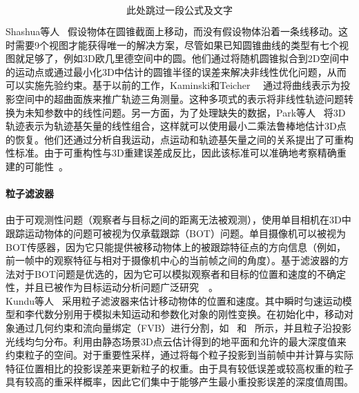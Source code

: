 $$此处跳过一段公式及文字$$

Shashua等人~\cite{shashua1999trajectory}
假设物体在圆锥截面上移动，而没有假设物体沿着一条线移动。这时需要9个视图才能获得唯一的解决方案，尽管如果已知圆锥曲线的类型有七个视图就足够了，例如3D欧几里德空间中的圆。他们通过将随机圆锥拟合到2D空间中的运动点或通过最小化3D中估计的圆锥半径的误差来解决非线性优化问题，从而可以实施先验约束。基于以前的工作，Kaminski和Teicher~\cite{kaminski2002general}~\cite{kaminski2004general}
通过将曲线表示为投影空间中的超曲面族来推广轨迹三角测量。这种多项式的表示将非线性轨迹问题转换为未知参数中的线性问题。另一方面，为了处理缺失的数据，Park等人~\cite{park20103d}
将3D轨迹表示为轨迹基矢量的线性组合，这样就可以使用最小二乘法鲁棒地估计3D点的恢复。他们还通过分析自我运动，点运动和轨迹基矢量之间的关系提出了可重构性标准。由于可重构性与3D重建误差成反比，因此该标准可以准确地考察精确重建的可能性~\cite{park20153d}。\\

\paragraph{粒子滤波器}
由于可观测性问题（观察者与目标之间的距离无法被观测），使用单目相机在3D中跟踪运动物体的问题可被视为仅承载跟踪（BOT）问题。单目摄像机可以被视为BOT传感器，因为它只能提供被移动物体上的被跟踪特征点的方向信息（例如，前一帧中的观察特征与相对于摄像机中心的当前帧之间的角度）。基于滤波器的方法对于BOT问题是优选的，因为它可以模拟观察者和目标的位置和速度的不确定性，并且已被作为目标运动分析问题广泛研究~\cite{aidala1983utilization}~\cite{le1998bearings}。\\

Kundu等人~\cite{kundu2011realtime}
采用粒子滤波器来估计移动物体的位置和速度。其中瞬时匀速运动模型和李代数分别用于模拟未知运动和参数化对象的刚性变换。在初始化中，移动对象通过几何约束和流向量绑定（FVB）进行分割，如~\cite{kundu2009moving}
和~\cite{kundu2010realtime}
所示，并且粒子沿投影光线均匀分布。利用由静态场景3D点云估计得到的地平面和允许的最大深度值来约束粒子的空间。对于重要性采样，通过将每个粒子投影到当前帧中并计算与实际特征位置相比的投影误差来更新粒子的权重。由于具有较低误差或较高权重的粒子具有较高的重采样概率，因此它们集中于能够产生最小重投影误差的深度值周围。


